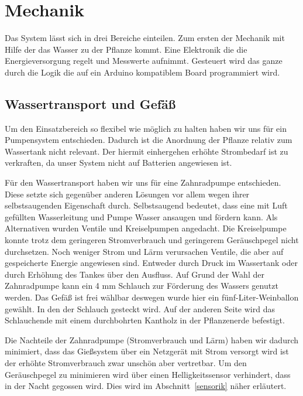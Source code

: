 \documentclass[]{IEEEtran}
\begin{document}
\section{Mechanik}
Das System lässt sich in drei Bereiche einteilen. Zum ersten der Mechanik mit Hilfe der das Wasser zu der Pflanze kommt. Eine Elektronik die die Energieversorgung regelt und Messwerte aufnimmt. Gesteuert wird das ganze durch die Logik die auf ein Arduino kompatiblem Board programmiert wird.
	\subsection{Wassertransport und Gefäß}
	Um den Einsatzbereich so flexibel wie möglich zu halten haben wir uns für ein Pumpensystem entschieden. Dadurch ist die Anordnung der Pflanze relativ zum Wassertank nicht relevant. Der hiermit einhergehen erhöhte Strombedarf ist zu verkraften, da unser System nicht auf Batterien angewiesen ist.
	
	Für den Wassertransport haben wir uns für eine Zahnradpumpe entschieden. Diese setzte sich gegenüber anderen Lösungen vor allem wegen ihrer selbstsaugenden Eigenschaft durch.
	 Selbstsaugend bedeutet, dass eine mit Luft gefüllten Wasserleitung und Pumpe Wasser ansaugen und fördern kann. Als Alternativen wurden Ventile und Kreiselpumpen angedacht. 
	 Die Kreiselpumpe konnte trotz dem geringeren Stromverbrauch und geringerem Geräuschpegel nicht durchsetzen. 
	 Noch weniger Strom und Lärm verursachen Ventile, die aber auf gespeicherte Energie angewiesen sind. 
	 Entweder durch Druck im Wassertank oder durch Erhöhung des Tankes über den Ausfluss. 
	 Auf Grund der Wahl der Zahnradpumpe kann ein 4 mm Schlauch zur Förderung des Wassers genutzt werden. Das Gefäß ist frei wählbar deswegen wurde hier ein fünf-Liter-Weinballon gewählt. 
	 In den der Schlauch gesteckt wird. Auf der anderen Seite wird das Schlauchende mit einem durchbohrten Kantholz in der Pflanzenerde befestigt.
	
	Die Nachteile der Zahnradpumpe (Stromverbrauch und Lärm) haben wir dadurch minimiert, dass das Gießsystem über ein Netzgerät mit Strom versorgt wird ist der erhöhte Stromverbrauch zwar unschön aber vertretbar. Um den Geräuschpegel zu minimieren wird über einen Helligkeitssensor verhindert, dass in der Nacht gegossen wird. Dies wird im Abschnitt~\ref{sensorik} näher erläutert.
	
\end{document}
